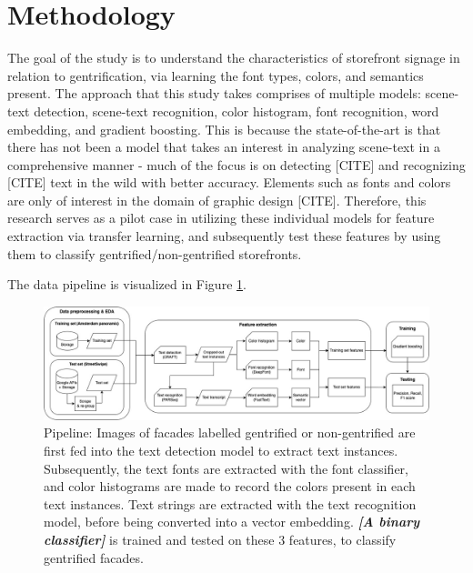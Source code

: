 \section{Methodology}
\label{sec:methodology}

The goal of the study is to understand the characteristics of storefront signage in relation to gentrification, via learning the font types, colors, and semantics present. The approach that this study takes comprises of multiple models: scene-text detection, scene-text recognition, color histogram, font recognition, word embedding, and gradient boosting. This is because the state-of-the-art is that there has not been a model that takes an interest in analyzing scene-text in a comprehensive manner - much of the focus is on detecting [CITE] and recognizing [CITE] text in the wild with better accuracy. Elements such as fonts and colors are only of interest in the domain of graphic design [CITE]. Therefore, this research serves as a pilot case in utilizing these individual models for feature extraction via transfer learning, and subsequently test these features by using them to classify gentrified/non-gentrified storefronts.

The data pipeline is visualized in Figure \ref{fig:pipeline}.

\begin{figure}[]
    \centering
    \includegraphics[width=\textwidth]{media/methodology/Pipeline.jpg}
    \caption{Pipeline: Images of facades labelled gentrified or non-gentrified are first fed into the text detection model to extract text instances. Subsequently, the text fonts are extracted with the font classifier, and color histograms are made to record the colors present in each text instances. Text strings are extracted with the text recognition model, before being converted into a vector embedding. \textbf{\textit{[A binary classifier]}} is trained and tested on these 3 features, to classify gentrified facades.}
    \label{fig:pipeline}
\end{figure}

